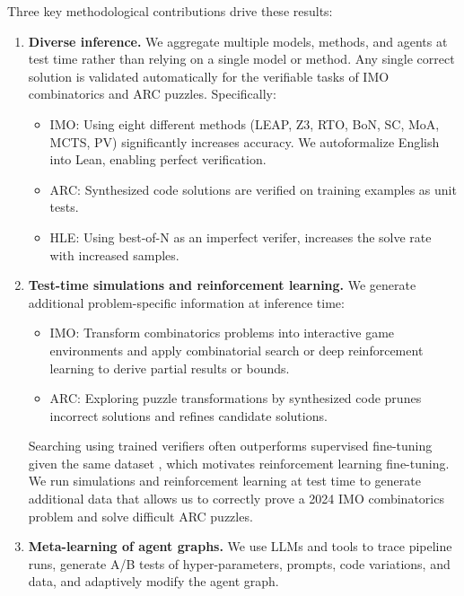 Three key methodological contributions drive these results:
\begin{enumerate}
\item \textbf{Diverse inference.} We aggregate multiple models, methods, and agents at test time rather than relying on a single model or method. Any single correct solution is validated automatically for the verifiable tasks of IMO combinatorics and ARC puzzles. Specifically: 
\begin{itemize} 
	\item IMO: Using eight different methods (LEAP, Z3, RTO, BoN, SC, MoA, MCTS, PV) significantly increases accuracy. We autoformalize English into Lean, enabling perfect verification. 
\item ARC: Synthesized code solutions are verified on training examples as unit tests. 
\item HLE: Using best-of-N as an imperfect verifer, increases the solve rate with increased samples. 
\end{itemize}

\item \textbf{Test-time simulations and reinforcement learning.} We generate additional problem-specific information at inference time:
\begin{itemize} 
\item IMO: Transform combinatorics problems into interactive game environments and apply combinatorial search or deep reinforcement learning to derive partial results or bounds. 
\item ARC: Exploring puzzle transformations by synthesized code prunes incorrect solutions and refines candidate solutions. 
\end{itemize}
Searching using trained verifiers often outperforms supervised fine-tuning given the same dataset \cite{cobbe2021training}, which motivates reinforcement learning fine-tuning. We run simulations and reinforcement learning at test time to generate additional data that allows us to correctly prove a 2024 IMO combinatorics problem and solve difficult ARC puzzles.

\item \textbf{Meta-learning of agent graphs.}
We use LLMs and tools to trace pipeline runs, generate A/B tests of hyper-parameters, prompts, code variations, and data, and adaptively modify the agent graph.

\end{enumerate}


